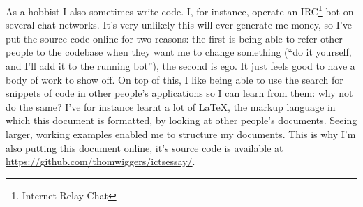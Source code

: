 \documentclass{article}
\begin{document}
As a hobbist I also sometimes write code. I, for instance, operate an
IRC\footnote{Internet Relay Chat} bot on several chat networks. It's very
unlikely this will ever generate me money, so I've put the source code online
for two reasons: the first is being able to refer other people to the codebase
when they want me to change something (``do it yourself, and I'll add it to the
running bot''), the second is ego. It just feels good to have a body of work to
show off. On top of this, I like being able to use the search for snippets of
code in other people's applications so I can learn from them: why not do the
same? I've for instance learnt a lot of \LaTeX, the markup language in which
this document is formatted, by looking at other people's documents. Seeing
larger, working examples enabled me to structure my documents. This is why I'm
also putting this document online, it's source code is available at
\url{https://github.com/thomwiggers/ictsessay/}.

\printbibliography 
\end{document}
